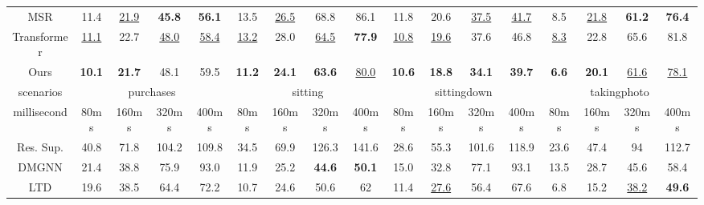 \begin{table}[h]
{\begin{tabular}{c|cccc|cccc|cccc|cccc}
MSR   & 11.4          & \underline{21.9}          & \textbf{45.8} & \textbf{56.1} & 13.5          & \underline{26.5}          & 68.8          & 86.1           & 11.8          & 20.6          & \underline{37.5}          & \underline{41.7}          & 8.5           & \underline{21.8}          & \textbf{61.2} & \textbf{76.4} \\
Transformer & \underline{11.1}          & 22.7          & \underline{48.0}          & \underline{58.4}          & \underline{13.2}          & 28.0          & \underline{64.5}          & \textbf{77.9}  & \underline{10.8}          & \underline{19.6}          & 37.6          & 46.8          & \underline{8.3}           & 22.8          & 65.6          & 81.8          \\
Ours   & \textbf{10.1} & \textbf{21.7} & 48.1          & 59.5          & \textbf{11.2} & \textbf{24.1} & \textbf{63.6} & \underline{80.0}           & \textbf{10.6} & \textbf{18.8} & \textbf{34.1} & \textbf{39.7} & \textbf{6.6}  & \textbf{20.1} & \underline{61.6}          & \underline{78.1}          \\ \hline
scenarios   & \multicolumn{4}{c|}{purchases}                                 & \multicolumn{4}{c|}{sitting}                                    & \multicolumn{4}{c|}{sittingdown}                               & \multicolumn{4}{c}{takingphoto}                               \\ \hline
millisecond & 80ms          & 160ms         & 320ms         & 400ms         & 80ms          & 160ms         & 320ms         & 400ms          & 80ms          & 160ms         & 320ms         & 400ms         & 80ms          & 160ms         & 320ms         & 400ms         \\ \hline
Res. Sup.   & 40.8          & 71.8          & 104.2         & 109.8         & 34.5          & 69.9          & 126.3         & 141.6          & 28.6          & 55.3          & 101.6         & 118.9         & 23.6          & 47.4          & 94            & 112.7         \\
DMGNN       & 21.4          & 38.8          & 75.9          & 93.0          & 11.9          & 25.2          & \textbf{44.6}          & \textbf{50.1}           & 15.0          & 32.8          & 77.1          & 93.1          & 13.5          & 28.7          & 45.6          & 58.4          \\
LTD   & 19.6          & 38.5          & 64.4          & 72.2          & 10.7          & 24.6          & 50.6          & 62             & 11.4          & \underline{27.6}          & 56.4          & 67.6          & 6.8           & 15.2          & \underline{38.2}          & \textbf{49.6}          \\

\end{tabular}}
\end{table}
